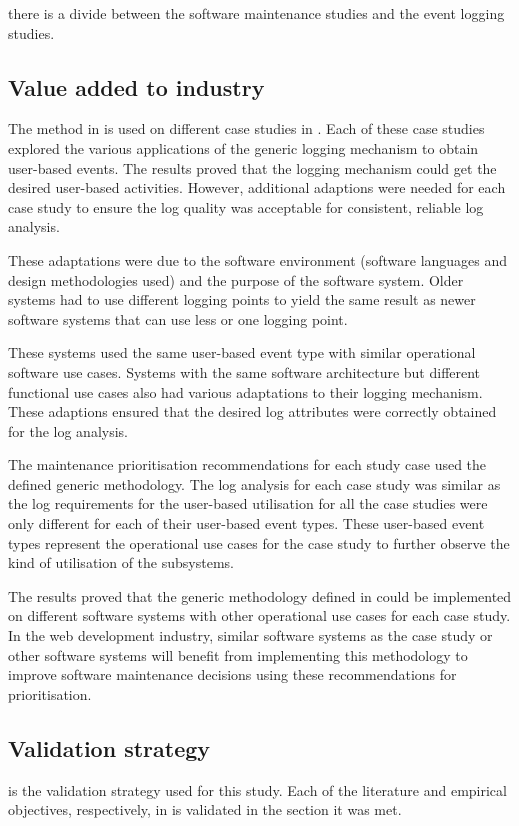  there is a divide between the software maintenance studies and the event logging studies.

\clearpage

\subsection{Value added to industry}
The method in  is used on different case studies in . Each of these case studies explored the various applications of the generic logging mechanism to obtain user-based events. The results proved that the logging mechanism could get the desired user-based activities. However, additional adaptions were needed for each case study to ensure the log quality was acceptable for consistent, reliable log analysis.\par These adaptations were due to the software environment (software languages and design methodologies used) and the purpose of the software system. Older systems had to use different logging points to yield the same result as newer software systems that can use less or one logging point.\par These systems used the same user-based event type with similar operational software use cases. Systems with the same software architecture but different functional use cases also had various adaptations to their logging mechanism. These adaptions ensured that the desired log attributes were correctly obtained for the log analysis. \par The maintenance prioritisation recommendations for each study case used the defined generic methodology. The log analysis for each case study was similar as the log requirements for the user-based utilisation for all the case studies were only different for each of their user-based event types. These user-based event types represent the operational use cases for the case study to further observe the kind of utilisation of the subsystems. \par The results proved that the generic methodology defined in  could be implemented on different software systems with other operational use cases for each case study. In the web development industry, similar software systems as the case study or other software systems will benefit from implementing this methodology to improve software maintenance decisions using these recommendations for prioritisation.

\subsection{Validation strategy}
 is the validation strategy used for this study. Each of the literature and empirical objectives, respectively, in  is validated in the section it was met.

